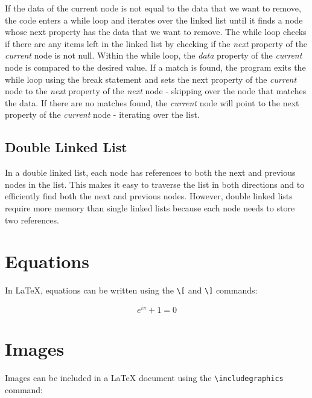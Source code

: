 \documentclass{article}
\begin{document}
If the data of the current node is not equal to the data that we want to remove, the code enters a while loop and iterates over the linked list until it finds a node whose next property has the data that we want to remove.
The while loop checks if there are any items left in the linked list by checking if the \textit{next} property of the \textit{current} node is not null. Within the while loop, the \textit{data} property of the \textit{current} node is compared to the desired value. If a match is found, the program exits the while loop using the break statement and sets the next property of the \textit{current} node to the \textit{next} property of the \textit{next} node - skipping over the node that matches the data. If there are no matches found, the \textit{current} node will point to the next property of the \textit{current} node - iterating over the list.


\newpage
\subsection[short]{Double Linked List}


In a double linked list, each node has references to both the next and previous nodes in the list. This makes it easy to traverse the list in both directions and to efficiently find both the next and previous nodes. However, double linked lists require more memory than single linked lists because each node needs to store two references.


\section{Equations}
In LaTeX, equations can be written using the \verb|\[| and \verb|\]| commands:

\[ e^{i\pi} + 1 = 0 \]

\section{Images}
Images can be included in a LaTeX document using the \verb|\includegraphics| command:

\begin{figure}
\centering
\end{figure}
\end{document}
